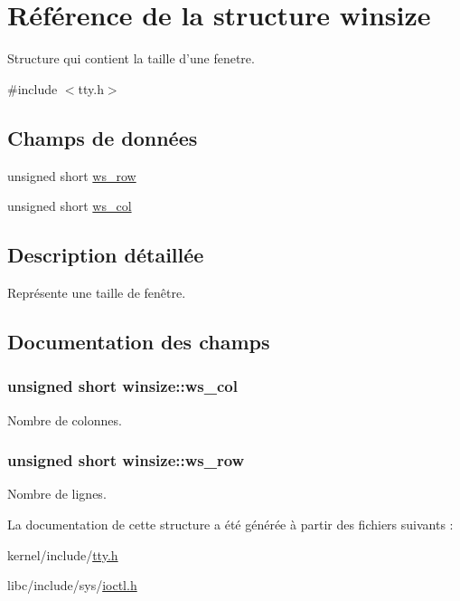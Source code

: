 \hypertarget{structwinsize}{\section{Référence de la structure winsize}
\label{structwinsize}
}


Structure qui contient la taille d'une fenetre.  




{\ttfamily \#include $<$tty.\-h$>$}

\subsection*{Champs de données}
\begin{DoxyCompactItemize}
\item 
unsigned short \hyperlink{structwinsize_a73698fa1d966374b0701e4bf225f0141}{ws\-\_\-row}
\item 
unsigned short \hyperlink{structwinsize_a80bedf71a49fd324e0d92d0702cc7005}{ws\-\_\-col}
\end{DoxyCompactItemize}


\subsection{Description détaillée}
Représente une taille de fenêtre. 

\subsection{Documentation des champs}
\hypertarget{structwinsize_a80bedf71a49fd324e0d92d0702cc7005}{
\subsubsection[{ws\-\_\-col}]{\setlength{\rightskip}{0pt plus 5cm}unsigned short winsize\-::ws\-\_\-col}}\label{structwinsize_a80bedf71a49fd324e0d92d0702cc7005}
Nombre de colonnes. \hypertarget{structwinsize_a73698fa1d966374b0701e4bf225f0141}{
\subsubsection[{ws\-\_\-row}]{\setlength{\rightskip}{0pt plus 5cm}unsigned short winsize\-::ws\-\_\-row}}\label{structwinsize_a73698fa1d966374b0701e4bf225f0141}
Nombre de lignes. 

La documentation de cette structure a été générée à partir des fichiers suivants \-:\begin{DoxyCompactItemize}
\item 
kernel/include/\hyperlink{tty_8h}{tty.\-h}\item 
libc/include/sys/\hyperlink{ioctl_8h}{ioctl.\-h}\end{DoxyCompactItemize}
